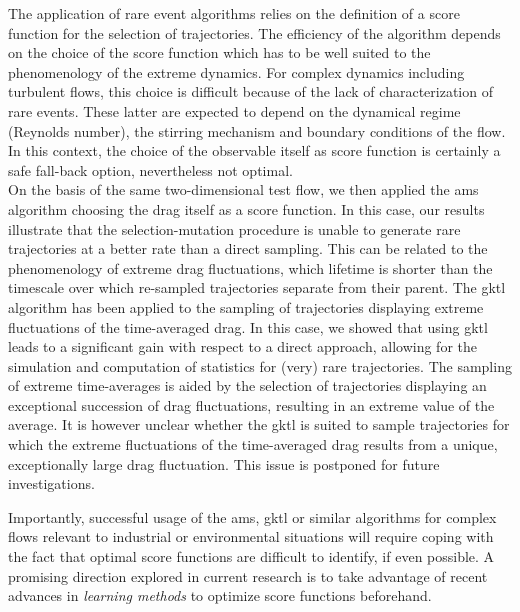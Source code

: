 \documentclass[pre,aps,floatfix,10pt,superscriptaddress, notitlepage,preprint]{revtex4-1}
\begin{document}
The application of rare event algorithms relies on the definition of a score function for the selection of trajectories.
The efficiency of the algorithm depends on the choice of the score function which has to be well suited to the phenomenology of the extreme dynamics.
For complex dynamics including turbulent flows, this choice is  difficult because of the lack of characterization of rare events. These latter are expected to depend on the dynamical regime (Reynolds number), the stirring mechanism and boundary conditions of the flow. In this context, the choice of the observable itself as score function is certainly a safe fall-back option, nevertheless not optimal.
\\
On the basis of the same two-dimensional test flow, we then applied the \ac{ams} algorithm choosing the drag itself as a score function.
In this case, our results illustrate that the selection-mutation procedure is unable to generate rare trajectories at a better rate than a direct sampling.
This can be related to the phenomenology of extreme drag fluctuations, which lifetime is shorter than the timescale over which re-sampled trajectories separate from their parent. 
The \ac{gktl} algorithm has been applied to the sampling of trajectories displaying extreme fluctuations of the time-averaged drag.
In this case, we showed that using \ac{gktl} leads to a significant gain with respect to a direct approach, allowing for the simulation and computation of statistics for (very) rare trajectories.
The sampling of extreme time-averages is aided by the selection of trajectories displaying an exceptional succession of drag fluctuations, resulting in an extreme value of the average.
It is however unclear whether the \ac{gktl} is suited to sample trajectories for which the extreme fluctuations of the time-averaged drag results from a unique, exceptionally large drag fluctuation. This issue is postponed for future investigations.

Importantly, successful usage of the \ac{ams}, \ac{gktl} or similar algorithms for complex flows relevant to industrial or environmental situations will require coping with the fact that optimal score functions
are difficult to identify, if even possible.
A promising direction explored in current research is to take advantage of recent advances in \emph{learning methods} to optimize score functions beforehand.
\end{document}
